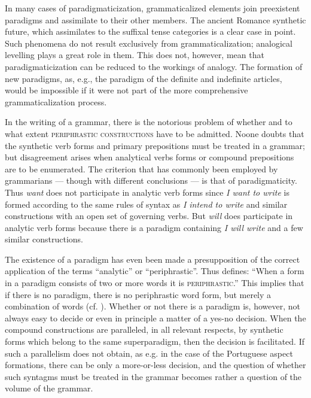 In many cases of paradigmaticization, grammaticalized elements join preexistent paradigms and assimilate to their other members. The ancient Romance synthetic future, which assimilates to the suffixal tense categories is a clear case in point. Such phenomena do not result exclusively from grammaticalization; analogical levelling plays a great role in them. This does not, however, mean that paradigmaticization can be reduced to the workings of analogy. The formation of new paradigms, as, e.g., the paradigm of the definite and indefinite articles, would be impossible if it were not part of the more comprehensive grammaticalization process.

In the writing of a grammar, there is the notorious problem of whether and to what extent \textsc{periphrastic constructions} have to be admitted. Noone doubts that the synthetic verb forms and primary prepositions must be treated in a grammar; but disagreement arises when analytical verbs forms or compound prepositions are to be enumerated. The criterion that has commonly been employed by grammarians — though with different conclusions — is that of paradigmaticity. Thus \textit{want} does not participate in analytic verb forms since \textit{I want to write} is formed according to the same rules of syntax as \textit{I intend to write} and similar constructions with an open set of governing verbs. But \textit{will} does participate in analytic verb forms because there is a paradigm containing \textit{I will write} and a few similar constructions.%

The existence of a paradigm has even been made a presupposition of the correct application of the terms ``analytic'' or ``periphrastic''. Thus \citet[55]{Matthews1981} defines: “When a form in a paradigm consists of two or more words it is \textsc{periphrastic}.” This implies that if there is no paradigm, there is no periphrastic word form, but merely a combination of words (cf. \citealt[82--87]{Žirmunskij1966}). Whether or not there is a paradigm is, however, not always easy to decide or even in principle a matter of a yes-no decision. When the compound constructions are paralleled, in all relevant respects, by synthetic forms which belong to the same superparadigm, then the decision is facilitated. If such a parallelism does not obtain, as e.g. in the case of the Portuguese aspect formations, there can be only a more-or-less decision, and the question of whether such syntagms must be treated in the grammar becomes rather a question of the volume of the grammar.

